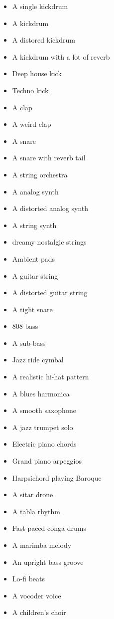 \documentclass[
  a4paper,  %
  twoside,  %
  bibliography=totoc,
  headsepline,
  cleardoublepage=empty,
  parskip=half,
  draft=false
]{scrbook}
\begin{document}
\begin{multicols}{4}
\fontsize{8pt}{11pt}\selectfont
\begin{itemize}
    \item A single kickdrum
    \item A kickdrum
    \item A distored kickdrum
    \item A kickdrum with a lot of reverb
    \item Deep house kick
    \item Techno kick
    \item A clap
    \item A weird clap
    \item A snare
    \item A snare with reverb tail
    \item A string orchestra
    \item A analog synth
    \item A distorted analog synth
    \item A string synth
    \item dreamy nostalgic strings
    \item Ambient pads
    \item A guitar string
    \item A distorted guitar string
    \item A tight snare
    \item 808 bass
    \item A sub-bass
    \item Jazz ride cymbal
    \item A realistic hi-hat pattern
    \item A blues harmonica
    \item A smooth saxophone
    \item A jazz trumpet solo
    \item Electric piano chords
    \item Grand piano arpeggios
    \item Harpsichord playing Baroque
    \item A sitar drone
    \item A tabla rhythm
    \item Fast-paced conga drums
    \item A marimba melody
    \item An upright bass groove
    \item Lo-fi beats
    \item A vocoder voice
    \item A children's choir

\end{itemize}
\end{multicols}
\end{document}
